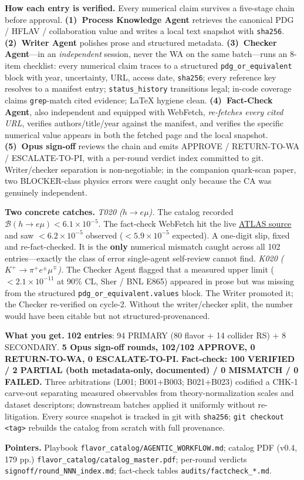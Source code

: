 \documentclass[11pt]{article}
\begin{document}
\textbf{How each entry is verified.}
Every numerical claim survives a five-stage chain before approval.
\textbf{(1)~Process Knowledge Agent} retrieves the canonical PDG / HFLAV /
collaboration value and writes a local text snapshot with \texttt{sha256}.
\textbf{(2)~Writer Agent} polishes prose and structured metadata.
\textbf{(3)~Checker Agent}---in an \emph{independent} session, never the WA
on the same batch---runs an 8-item checklist: every numerical claim traces
to a structured \texttt{pdg\_or\_equivalent} block with year, uncertainty,
URL, access date, \texttt{sha256}; every reference key resolves to a
manifest entry; \texttt{status\_history} transitions legal; in-code coverage
claims \texttt{grep}-match cited evidence; \LaTeX{} hygiene clean.
\textbf{(4)~Fact-Check Agent}, also independent and equipped with WebFetch,
\emph{re-fetches every cited URL}, verifies authors/title/year against the
manifest, and verifies the specific numerical value appears in both the
fetched page and the local snapshot.
\textbf{(5)~Opus sign-off} reviews the chain and emits APPROVE /
RETURN-TO-WA / ESCALATE-TO-PI, with a per-round verdict index committed to
git. Writer/checker separation is non-negotiable; in the companion quark-scan
paper, two BLOCKER-class physics errors were caught only because the CA was
genuinely independent.

\textbf{Two concrete catches.}
\emph{T020 ($h\to e\mu$).} The catalog recorded
$\mathcal{B}(h\to e\mu) < 6.1\times 10^{-5}$. The fact-check WebFetch hit
the live \href{https://arxiv.org/abs/1909.10235}{ATLAS source} and saw
$<6.2\times 10^{-5}$ observed ($<5.9\times 10^{-5}$ expected). A
one-digit slip, fixed and re-fact-checked. It is the \textbf{only}
numerical mismatch caught across all 102 entries---exactly the class of
error single-agent self-review cannot find.
\emph{K020 ($K^+\to\pi^+ e^\pm\mu^\mp$).} The Checker Agent flagged that a
measured upper limit ($<2.1\times 10^{-11}$ at 90\% CL, Sher / BNL E865)
appeared in prose but was missing from the structured
\texttt{pdg\_or\_equivalent.values} block. The Writer promoted it; the
Checker re-verified on cycle-2. Without the writer/checker split, the
number would have been citable but not structured-provenanced.

\textbf{What you get.}
\textbf{102 entries}: 94 PRIMARY (80 flavor + 14 collider RS) + 8
SECONDARY. \textbf{5 Opus sign-off rounds, 102/102 APPROVE,
0 RETURN-TO-WA, 0 ESCALATE-TO-PI.} \textbf{Fact-check: 100 VERIFIED /
2 PARTIAL (both metadata-only, documented) / 0 MISMATCH / 0 FAILED.}
Three arbitrations (L001; B001+B003; B021+B023) codified a CHK-1
carve-out separating measured observables from theory-normalization
scales and dataset descriptors; downstream batches applied it uniformly
without re-litigation. Every source snapshot is tracked in git with
\texttt{sha256}; \verb|git checkout <tag>| rebuilds the catalog from
scratch with full provenance.

{\sloppy\textbf{Pointers.} Playbook
\texttt{flavor\_catalog/AGENTIC\_WORKFLOW.md};
catalog PDF (v0.4, 179 pp.) \texttt{flavor\_catalog/catalog\_master.pdf};
per-round verdicts \texttt{signoff/round\_NNN\_index.md};
fact-check tables \texttt{audits/factcheck\_*.md}.\par}
\end{document}
